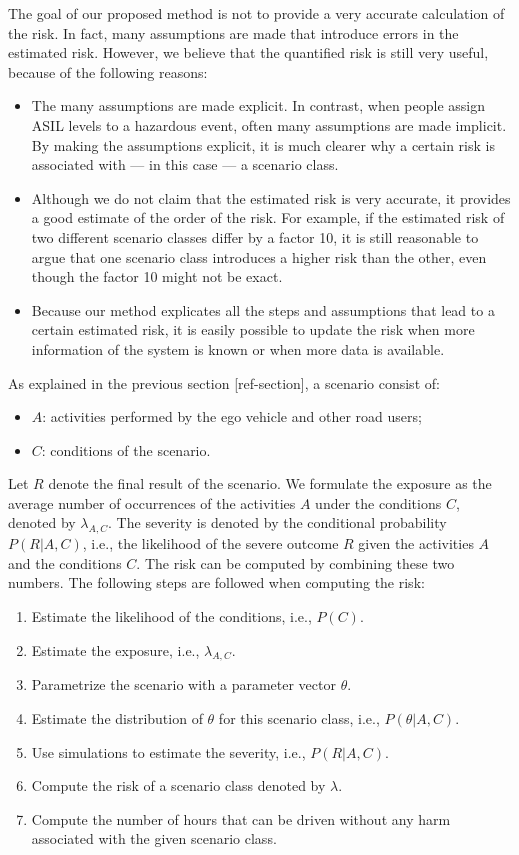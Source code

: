 The goal of our proposed method is not to provide a very accurate calculation of the risk. In fact, many assumptions are made that introduce errors in the estimated risk. However, we believe that the quantified risk is still very useful, because of the following reasons:
\begin{itemize}
	\item The many assumptions are made explicit. In contrast, when people assign ASIL levels to a hazardous event, often many assumptions are made implicit. By making the assumptions explicit, it is much clearer why a certain risk is associated with --- in this case --- a scenario class.
	\item Although we do not claim that the estimated risk is very accurate, it provides a good estimate of the order of the risk. For example, if the estimated risk of two different scenario classes differ by a factor 10, it is still reasonable to argue that one scenario class introduces a higher risk than the other, even though the factor 10 might not be exact.
	\item Because our method explicates all the steps and assumptions that lead to a certain estimated risk, it is easily possible to update the risk when more information of the system is known or when more data is available.
\end{itemize}

As explained in the previous section [ref-section], a scenario consist of:
\begin{itemize}
	\item $A$: activities performed by the ego vehicle and other road users;
	\item $C$: conditions of the scenario.
\end{itemize}
Let $R$ denote the final result of the scenario. We formulate the exposure as the average number of occurrences of the activities $A$ under the conditions $C$, denoted by $\lambda_{A,C}$. The severity is denoted by the conditional probability $P(R|A,C)$, i.e., the likelihood of the severe outcome $R$ given the activities $A$ and the conditions $C$. The risk can be computed by combining these two numbers. The following steps are followed when computing the risk:
\begin{enumerate}
	\item Estimate the likelihood of the conditions, i.e., $P(C)$.
	\item Estimate the exposure, i.e., $\lambda_{A,C}$.
	\item Parametrize the scenario with a parameter vector $\theta$.
	\item Estimate the distribution of $\theta$ for this scenario class, i.e., $P(\theta|A,C)$.
	\item Use simulations to estimate the severity, i.e., $P(R|A,C)$.
	\item Compute the risk of a scenario class denoted by $\lambda$.
	\item Compute the number of hours that can be driven without any harm associated with the given scenario class.
\end{enumerate}

